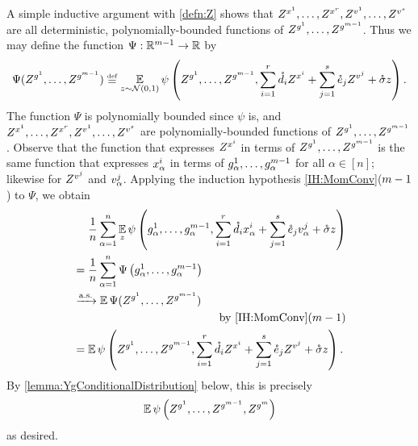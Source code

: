 \documentclass[main.tex]{subfiles}
\begin{document}
A simple inductive argument with \cref{defn:Z} shows that $Z^{x^1}, \ldots, Z^{x^r}, Z^{v^1}, \ldots, Z^{v^s}$ are all deterministic, polynomially-bounded functions of $Z^{g^1}, \ldots, Z^{g^{m-1}}$.
Thus we may define the function $\Psi: \mathbb{R}^{m-1} \to \mathbb{R}$ by
\[
\Psi(\Zz^{g^1}, \ldots, \Zz^{g^{\MM-1}})
  \defeq
    \EV_{z \sim \Gaus(0, 1)}
      \psi\lp \Zz^{g^1}, \ldots, \Zz^{g^{\MM-1}},
        \sum_{i=1}^r \mathring{\dme}_i \Zz^{\xme^i}
        + \sum_{j=1}^s \mathring{\eme}_j \Zz^{\vme^j}
        + \mathring \sigma z
      \rp
      .
\]
The function $\Psi$ is polynomially bounded since $\psi$ is, and
$Z^{x^1}, \ldots, Z^{x^r}, Z^{v^1}, \ldots, Z^{v^s}$ are  polynomially-bounded functions of $Z^{g^1}, \ldots, Z^{g^{m-1}}$.
Observe that the function that expresses $Z^{x^i}$ in terms of $Z^{g^1}, \ldots, Z^{g^{m-1}}$ is the same function that expresses $x^i_\alpha$ in terms of $g^1_\alpha, \ldots, g^{m-1}_\alpha$ for all $\alpha \in[n]$; likewise for $Z^{v^j}$ and $v^j_\alpha$.
Applying the induction hypothesis \ref{IH:MomConv}($m-1$) to $\Psi$, we obtain
\begin{align*}
    &\phantomeq
        \f 1 n \sum_{\alpha = 1}^n
            \EV_z
                {
                    \psi\lp
                        g^1_\alpha, \ldots, g^{\MM-1}_\alpha,
                        \sum_{i=1}^r \mathring {\dme}_i \xme^i_\alpha +
                        \sum_{j=1}^s \mathring {\eme}_j \vme^j_\alpha + \mathring \sigma z
                        \rp
                }
        \\
    &=
        \f 1 n \sum_{\alpha = 1}^n
                {
                    \Psi\lp
                        g^1_\alpha, \ldots, g^{\MM-1}_\alpha
                        \rp
                }
        \\
    &\asto
        \EV \Psi(\Zz^{g^1}, \ldots, \Zz^{g^{\MM-1}})
        \\
    &\pushright{
      \text{by \ref{IH:MomConv}$(\MM-1)$}
      }
        \\
    &=
        \EV
        \psi\lp
          \Zz^{g^1}, \ldots, \Zz^{g^{\MM-1}},
          \sum_{i=1}^r \mathring {\dme}_i \Zz^{\xme^i} +
            \sum_{j=1}^s \mathring {\eme}_j \Zz^{\vme^j} + \mathring \sigma z
          \rp
          .
\end{align*}
By \cref{lemma:YgConditionalDistribution} below, this is precisely
\begin{align*}
\operatorname*{\mathbb{E}} \psi\left(
            Z^{g^1}, \ldots, Z^{g^{m-1}}, Z^{g^{m}}\right)
\end{align*}
as desired.
\end{document}
